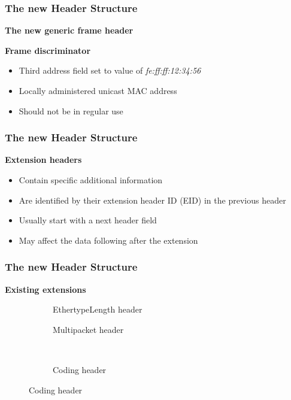\documentclass[t]{beamer}
\begin{document}
\begin{frame}
    \frametitle{The new Header Structure}
    \textbf{The new generic frame header}

    \begin{figure}
	
	\end{figure}
	\pause

    \textbf{Frame discriminator}
    \begin{itemize}
        \item Third address field set to value of \emph{fe:ff:ff:12:34:56} \pause
        \item Locally administered unicast MAC address \pause
        \item Should not be in regular use
    \end{itemize}

\end{frame}

\begin{frame}
    \frametitle{The new Header Structure}
    \textbf{Extension headers}

    \begin{itemize}
        \item Contain specific additional information \pause
        \item Are identified by their extension header ID (EID) in the previous header \pause
        \item Usually start with a next header field \pause
		\item May affect the data following after the extension
    \end{itemize}
    \pause

    \vspace{0.2cm}
    \begin{figure}
    
    \end{figure}

\end{frame}

\begin{frame}
    \frametitle{The new Header Structure}
    \textbf{Existing extensions}

    
    \begin{figure}
        \begin{subfigure}[b]{.45\linewidth}
        
	\caption{EthertypeLength header}
	\end{subfigure}
	\begin{subfigure}[b]{.45\linewidth}
        
	\caption{Multipacket header}
        \end{subfigure}\\
    \vspace{0.5cm}
	\begin{subfigure}[b]{.8\linewidth}
        
	\caption{Coding header}
        \end{subfigure}
    \end{figure}

    

\end{frame}
\end{document}
